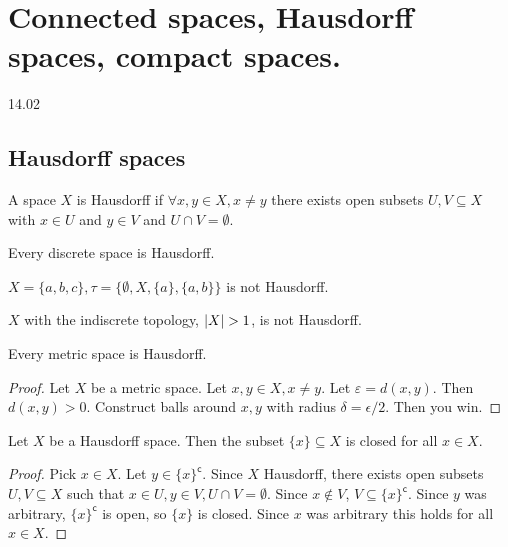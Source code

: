 \section{Connected spaces, Hausdorff spaces, compact spaces.}
14.02

\subsection{Hausdorff spaces}

\begin{definition}[Hausdorff]
    A space \( X \) is Hausdorff if
    \( \forall x, y \in X , x \neq y\)
    there exists open subsets \( U, V \subseteq X \)
    with \( x \in U \) and \( y \in V \) and \( U \cap V = \emptyset \).
\end{definition}

\begin{example}
    Every discrete space is Hausdorff.
\end{example}

\begin{nonexample}
  \( X = \{ a, b, c \}, \tau = \{ \emptyset, X, \{a\}, \{a, b\}  \} \) is not Hausdorff.
\end{nonexample}

\begin{nonexample}
  \( X \) with the indiscrete topology, \( \left\lvert{X}\right\rvert > 1 \), is not Hausdorff.
\end{nonexample}

\begin{proposition}
   Every metric space is Hausdorff. 
\end{proposition}

\begin{proof}
    Let \( X \) be a metric space.
    Let \( x, y \in X, x \neq y \).
    Let \( \varepsilon = d(x, y) \). Then \( d(x, y) > 0 \).
    Construct balls around \( x, y \) with radius \( \delta = \epsilon/2 \).
    Then you win.
\end{proof}

\begin{theorem}
    Let \( X \) be a Hausdorff space.
    Then the subset \( \{ x \} \subseteq X  \)
    is closed for all \( x \in X \).
\end{theorem}

\begin{proof}
  Pick \( x \in X \).
  Let \( y \in \{ x \} ^\mathsf{c} \).
  Since \( X \) Hausdorff,
  there exists open subsets \( U, V \subseteq X \)
  such that \( x \in U, y \in V, U \cap V = \emptyset \).
  Since \( x \notin V \), \( V \subseteq \{ x \} ^\mathsf{c} \).
  Since \( y \) was arbitrary, \( \{ x \} ^\mathsf{c} \)
  is open, so \( \{ x \}  \) is closed. Since \( x \) was
  arbitrary this holds for all \( x \in X \).
\end{proof}

